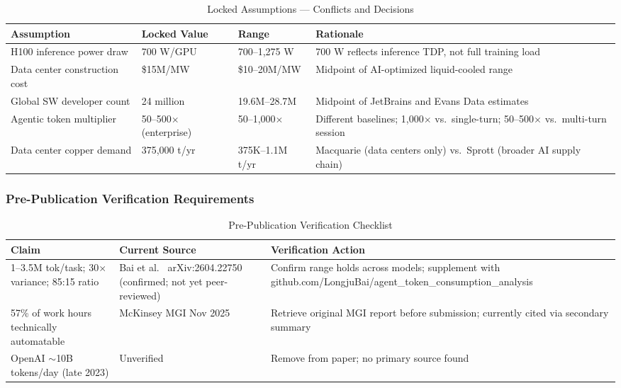\documentclass{article}
\begin{document}
\begin{table}[ht]
\centering
\caption{Locked Assumptions --- Conflicts and Decisions}
\label{tab:locked-assumptions}
\small
\begin{tabular}{@{}p{3cm}p{2.2cm}p{2.2cm}p{4cm}@{}}
\toprule
\textbf{Assumption} & \textbf{Locked Value} & \textbf{Range} & \textbf{Rationale} \\
\midrule
H100 inference power draw & 700 W/GPU & 700--1,275 W & 700 W reflects inference TDP, not full training load \\
Data center construction cost & \$15M/MW & \$10--20M/MW & Midpoint of AI-optimized liquid-cooled range \\
Global SW developer count & 24 million & 19.6M--28.7M & Midpoint of JetBrains and Evans Data estimates \\
Agentic token multiplier & 50--500$\times$ (enterprise) & 50--1,000$\times$ & Different baselines; 1,000$\times$ vs.\ single-turn; 50--500$\times$ vs.\ multi-turn session \\
Data center copper demand & 375,000 t/yr & 375K--1.1M t/yr & Macquarie (data centers only) vs.\ Sprott (broader AI supply chain) \\
\bottomrule
\end{tabular}
\end{table}

\subsubsection{Pre-Publication Verification Requirements}

\begin{table}[ht]
\centering
\caption{Pre-Publication Verification Checklist}
\label{tab:verification}
\small
\begin{tabular}{@{}p{3.8cm}p{2.5cm}p{4.5cm}@{}}
\toprule
\textbf{Claim} & \textbf{Current Source} & \textbf{Verification Action} \\
\midrule
1--3.5M tok/task; 30$\times$ variance; 85:15 ratio & Bai et al.\ \citeyear{bai2026agent} arXiv:2604.22750 (confirmed; not yet peer-reviewed) & Confirm range holds across models; supplement with github.com/LongjuBai/agent\_token\_consumption\_analysis \\
57\% of work hours technically automatable & McKinsey MGI Nov 2025 & Retrieve original MGI report before submission; currently cited via secondary summary \\
OpenAI $\sim$10B tokens/day (late 2023) & Unverified & Remove from paper; no primary source found \\
\bottomrule
\end{tabular}
\end{table}
\end{document}
